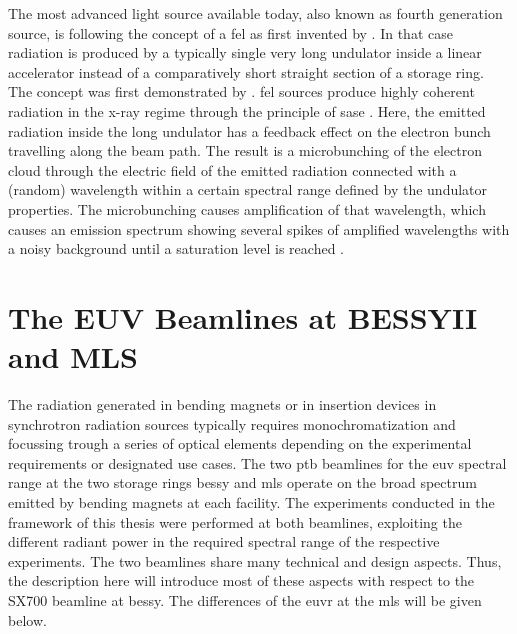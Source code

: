 The most advanced light source available today, also known as fourth generation source, is following the concept of a \gls{fel} as first invented by \textcite{madey_stimulated_1971}. In that case radiation is produced by a typically single very long undulator inside a linear accelerator instead of a comparatively short straight section of a storage ring. The concept was first demonstrated by \textcite{deacon_first_1977}. \Gls{fel} sources produce highly coherent radiation in the x-ray regime through the principle of \gls{sase} \cite{derbenev_possibility_1982, bonifacio_collective_1984}. Here, the emitted radiation inside the long undulator has a feedback effect on the electron bunch travelling along the beam path. The result is a microbunching of the electron cloud through the electric field of the emitted radiation connected with a (random) wavelength within a certain spectral range defined by the undulator properties. The microbunching causes amplification of that wavelength, which causes an emission spectrum showing several spikes of amplified wavelengths with a noisy background until a saturation level is reached \cite{milton_exponential_2001}.


\section{The EUV Beamlines at BESSYII and MLS}
The radiation generated in bending magnets or in insertion devices in synchrotron radiation sources typically requires monochromatization and focussing trough a series of optical elements depending on the experimental requirements or designated use cases. The two \gls{ptb} beamlines for the \gls{euv} spectral range at the two storage rings \gls{bessy} and \gls{mls} operate on the broad spectrum emitted by bending magnets at each facility. The experiments conducted in the framework of this thesis were performed at both beamlines, exploiting the different radiant power in the required spectral range of the respective experiments. The two beamlines share many technical and design aspects. Thus, the description here will introduce most of these aspects with respect to the SX700 beamline at \gls{bessy}. The differences of the \gls{euvr} at the \gls{mls} will be given below.

